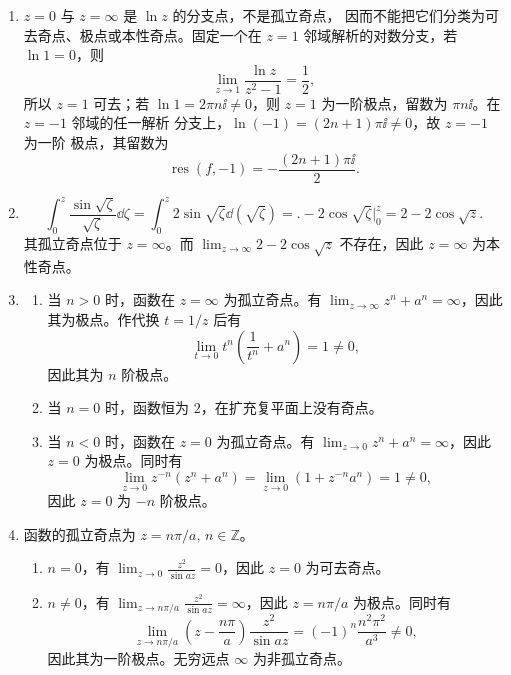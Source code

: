 \begin{question}
\begin{solution}
\begin{enumerate}
\begin{enumerate}
   无穷远点 \(\infty\) 为非孤立奇点。

   \end{enumerate}
  \item \(z=0\) 与 \(z=\infty\) 是 \(\ln z\) 的分支点，不是孤立奇点，
  因而不能把它们分类为可去奇点、极点或本性奇点。固定一个在
  \(z=1\) 邻域解析的对数分支，若 \(\ln1=0\)，则
  \[
  \lim_{z\to1}\frac{\ln z}{z^2-1}=\frac12,
  \]
  所以 \(z=1\) 可去；若 \(\ln1=2\pi n\ii\ne0\)，则 \(z=1\)
  为一阶极点，留数为 \(\pi n\ii\)。在 \(z=-1\) 邻域的任一解析
  分支上，\(\ln(-1)=(2n+1)\pi\ii\ne0\)，故 \(z=-1\) 为一阶
  极点，其留数为
  \[
  \operatorname{res}(f,-1)
  =-\frac{(2n+1)\pi\ii}{2}.
  \]
  \item \[
\int_0^z \frac{\sin\sqrt{\zeta}}{\sqrt{\zeta}}\dd{}\zeta
= \int_0^z 2\sin\sqrt{\zeta}\dd{}(\sqrt{\zeta})
= \bigl.-2\cos\sqrt{\zeta}\bigr|_0^z
= 2 - 2\cos\sqrt{z}.
\]
其孤立奇点位于 \(z=\infty\)。而 \(\displaystyle\lim_{z\to\infty} 2 - 2\cos\sqrt{z}\) 不存在，因此 \(z=\infty\) 为本性奇点。

  \item 
  \begin{enumerate}
    \item 当 \(n>0\) 时，函数在 \(z=\infty\) 为孤立奇点。有 \(\displaystyle\lim_{z\to\infty} z^n + a^n = \infty\)，因此其为极点。作代换 \(t=1/z\) 后有
   \[
   \lim_{t\to 0} t^n \left(\frac{1}{t^n} + a^n\right) = 1 \neq 0,
   \]
   因此其为 \(n\) 阶极点。
    \item 当 \(n=0\) 时，函数恒为 \(2\)，在扩充复平面上没有奇点。
     \item 当 \(n<0\) 时，函数在 \(z=0\) 为孤立奇点。有 \(\displaystyle\lim_{z\to 0} z^n + a^n = \infty\)，因此 \(z=0\) 为极点。同时有
   \[
   \lim_{z\to 0} z^{-n} (z^n + a^n) = \lim_{z\to 0} (1 + z^{-n}a^n) = 1 \neq 0,
   \]
   因此 \(z=0\) 为 \(-n\) 阶极点。

  \end{enumerate}
  \item 函数的孤立奇点为 \(z=n\pi/a,\,n\in\mathbb{Z}\)。
   \begin{enumerate}
     \item \(n = 0\)，有 \(\displaystyle\lim_{z\to 0} \frac{z^2}{\sin a z} = 0\)，因此 \(z=0\) 为可去奇点。
     \item \(n \neq 0\)，有 \(\displaystyle\lim_{z\to n\pi/a} \frac{z^2}{\sin a z} = \infty\)，因此 \(z=n\pi/a\) 为极点。同时有
   \[
   \lim_{z\to n\pi/a} \left(z - \frac{n\pi}{a}\right) \frac{z^2}{\sin a z}
   =(-1)^n\frac{n^2\pi^2}{a^3}\neq0,
   \]
   因此其为一阶极点。无穷远点 \(\infty\) 为非孤立奇点。
   \end{enumerate}
\end{enumerate}
\end{solution}
\end{question}
